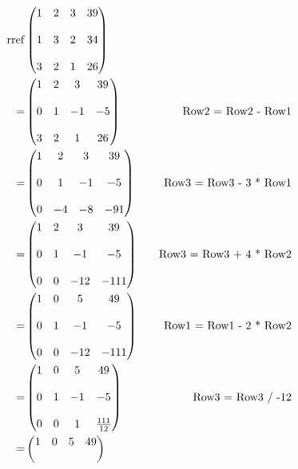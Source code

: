 \documentclass{article}
\begin{document}
\begin{align*}
\mathop{\rm rref} & \begin{pmatrix}
1 & 2 & 3 & 39 \\ \\
1 & 3 & 2 & 34 \\ \\
3 & 2 & 1 & 26
\end{pmatrix} \\
= & \begin{pmatrix}
1 & 2 & 3 & 39 \\ \\
0 & 1 & -1 & -5 \\ \\
3 & 2 & 1 & 26
\end{pmatrix} \quad &\text{Row2 = Row2 - Row1}  \\
= & \begin{pmatrix}
1 & 2 & 3 & 39 \\ \\
0 & 1 & -1 & -5 \\ \\
0 & -4 & -8 & -91
\end{pmatrix} \quad &\text{Row3 = Row3 - 3 * Row1} \\
= & \begin{pmatrix}
1 & 2 & 3 & 39 \\ \\
0 & 1 & -1 & -5 \\ \\
0 & 0 & -12 & -111
\end{pmatrix} \quad &\text{Row3 = Row3 + 4 * Row2} \\
= & \begin{pmatrix}
1 & 0 & 5 & 49 \\ \\
0 & 1 & -1 & -5 \\ \\
0 & 0 & -12 & -111
\end{pmatrix} &\text{Row1 = Row1 - 2 * Row2} \\
= & \begin{pmatrix}
1 & 0 & 5 & 49 \\ \\
0 & 1 & -1 & -5 \\ \\
0 & 0 & 1 & \frac{111}{12}
\end{pmatrix} \quad &\text{Row3 = Row3 / -12} \\
= & \begin{pmatrix}
1 & 0 & 5 & 49 \\ \\

\end{pmatrix}
\end{align*}
\end{document}
